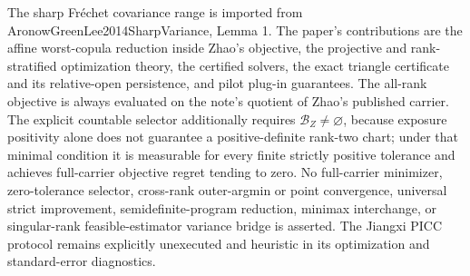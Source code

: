 The sharp Fr\'echet covariance range is imported from AronowGreenLee2014SharpVariance, Lemma 1.  The paper's contributions are the affine worst-copula reduction inside Zhao's objective, the projective and rank-stratified optimization theory, the certified solvers, the exact triangle certificate and its relative-open persistence, and pilot plug-in guarantees.  The all-rank objective is always evaluated on the note's quotient of Zhao's published carrier.  The explicit countable selector additionally requires \(\mathcal B_Z\ne\varnothing\), because exposure positivity alone does not guarantee a positive-definite rank-two chart; under that minimal condition it is measurable for every finite strictly positive tolerance and achieves full-carrier objective regret tending to zero.  No full-carrier minimizer, zero-tolerance selector, cross-rank outer-argmin or point convergence, universal strict improvement, semidefinite-program reduction, minimax interchange, or singular-rank feasible-estimator variance bridge is asserted.  The Jiangxi PICC protocol remains explicitly unexecuted and heuristic in its optimization and standard-error diagnostics.